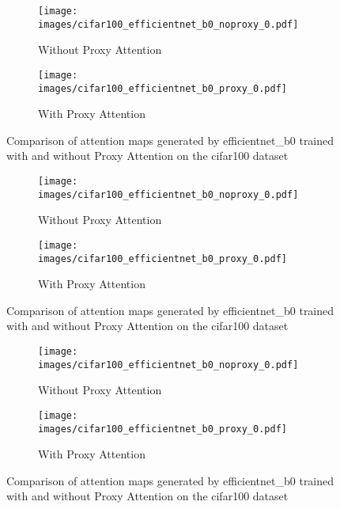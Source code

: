 
    \begin{figure}[H]
        \centering
        \begin{subfigure}[b]{1\textwidth}
            \texttt{[image: images/cifar100\_efficientnet\_b0\_noproxy\_0.pdf]}
            \caption{Without Proxy Attention}
        \end{subfigure}
        \hfill
        \begin{subfigure}[b]{1\textwidth}
            \texttt{[image: images/cifar100\_efficientnet\_b0\_proxy\_0.pdf]}
            \caption{With Proxy Attention}
        \end{subfigure}
        \caption{Comparison of attention maps generated by efficientnet\_b0 trained with and without Proxy Attention on the cifar100 dataset}
    \end{figure}
    

    \begin{figure}[H]
        \centering
        \begin{subfigure}[b]{1\textwidth}
            \texttt{[image: images/cifar100\_efficientnet\_b0\_noproxy\_0.pdf]}
            \caption{Without Proxy Attention}
        \end{subfigure}
        \hfill
        \begin{subfigure}[b]{1\textwidth}
            \texttt{[image: images/cifar100\_efficientnet\_b0\_proxy\_0.pdf]}
            \caption{With Proxy Attention}
        \end{subfigure}
        \caption{Comparison of attention maps generated by efficientnet\_b0 trained with and without Proxy Attention on the cifar100 dataset}
    \end{figure}
    

    \begin{figure}[H]
        \centering
        \begin{subfigure}[b]{1\textwidth}
            \texttt{[image: images/cifar100\_efficientnet\_b0\_noproxy\_0.pdf]}
            \caption{Without Proxy Attention}
        \end{subfigure}
        \hfill
        \begin{subfigure}[b]{1\textwidth}
            \texttt{[image: images/cifar100\_efficientnet\_b0\_proxy\_0.pdf]}
            \caption{With Proxy Attention}
        \end{subfigure}
        \caption{Comparison of attention maps generated by efficientnet\_b0 trained with and without Proxy Attention on the cifar100 dataset}
    \end{figure}
    


